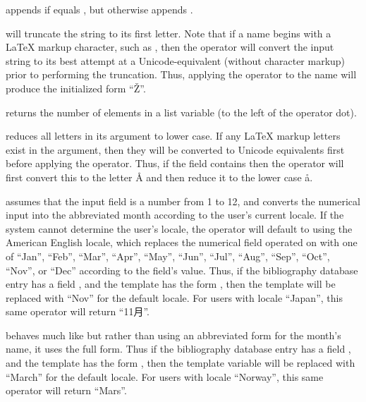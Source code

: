 \documentclass[letterpaper,10pt,english]{sphinxmanual}
\begin{document}
 appends  if  equals , but otherwise appends .

 will truncate the string to its first letter. Note that if a name begins with a LaTeX markup character, such as , then the operator will convert the input string to its best attempt at a Unicode-equivalent (without character markup) prior to performing the truncation. Thus, applying the  operator to the name  will produce the initialized form “Ž”.

 returns the number of elements in a list variable (to the left of the operator dot).

 reduces all letters in its argument to lower case. If any LaTeX markup letters exist in the argument, then they will be converted to Unicode equivalents first before applying the operator. Thus, if the field  contains  then the operator will first convert this to the letter Å and then reduce it to the lower case å.

 assumes that the input field is a number from 1 to 12, and converts the numerical input into the abbreviated month according to the user’s current locale. If the system cannot determine the user’s locale, the operator will default to using the American English locale, which replaces the numerical field operated on with one of “Jan”, “Feb”, “Mar”, “Apr”, “May”, “Jun”, “Jul”, “Aug”, “Sep”, “Oct”, “Nov”, or “Dec” according to the field’s value. Thus, if the bibliography database entry has a field , and the template has the form , then the template will be replaced with “Nov” for the default locale. For users with locale “Japan”, this same operator will return “11月”.

 behaves much like  but rather than using an abbreviated form for the month’s name, it uses the full form. Thus if the bibliography database entry has a field , and the template has the form , then the template variable will be replaced with “March” for the default locale. For users with locale “Norway”, this same operator will return “Mars”.
\end{document}
